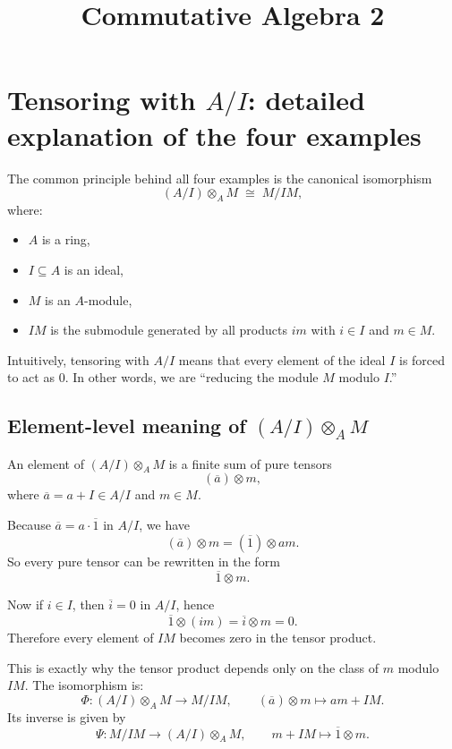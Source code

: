 \documentclass[12pt,a4paper]{article}
\title{Commutative Algebra 2}
\author{}
\date{}
\theoremstyle{plain}
\theoremstyle{definition}      %
\begin{document}
	\maketitle
	
	\section{Tensoring with \texorpdfstring{$A/I$}{A/I}: detailed explanation of the four examples}
	
	The common principle behind all four examples is the canonical isomorphism
	\[
	(A/I)\otimes_A M \;\cong\; M/IM,
	\]
	where:
	\begin{itemize}
		\item \(A\) is a ring,
		\item \(I\subseteq A\) is an ideal,
		\item \(M\) is an \(A\)-module,
		\item \(IM\) is the submodule generated by all products \(im\) with \(i\in I\) and \(m\in M\).
	\end{itemize}
	
	Intuitively, tensoring with \(A/I\) means that every element of the ideal \(I\) is forced to act as \(0\). In other words, we are ``reducing the module \(M\) modulo \(I\).''
	
	\subsection{Element-level meaning of \texorpdfstring{$(A/I)\otimes_A M$}{(A/I) tensor M}}
	
	An element of \((A/I)\otimes_A M\) is a finite sum of pure tensors
	\[
	(\overline{a})\otimes m,
	\]
	where \(\overline{a}=a+I\in A/I\) and \(m\in M\).
	
	Because \(\overline{a}=a\cdot \overline{1}\) in \(A/I\), we have
	\[
	(\overline{a})\otimes m
	=
	(\overline{1})\otimes am.
	\]
	So every pure tensor can be rewritten in the form
	\[
	\overline{1}\otimes m.
	\]
	
	Now if \(i\in I\), then \(\overline{i}=0\) in \(A/I\), hence
	\[
	\overline{1}\otimes (im)
	=
	\overline{i}\otimes m
	=
	0.
	\]
	Therefore every element of \(IM\) becomes zero in the tensor product.
	
	This is exactly why the tensor product depends only on the class of \(m\) modulo \(IM\). The isomorphism is:
	\[
	\Phi:(A/I)\otimes_A M \longrightarrow M/IM,
	\qquad
	(\overline{a})\otimes m \longmapsto am+IM.
	\]
	Its inverse is given by
	\[
	\Psi:M/IM \longrightarrow (A/I)\otimes_A M,
	\qquad
	m+IM \longmapsto \overline{1}\otimes m.
	\]
	
\end{document}
